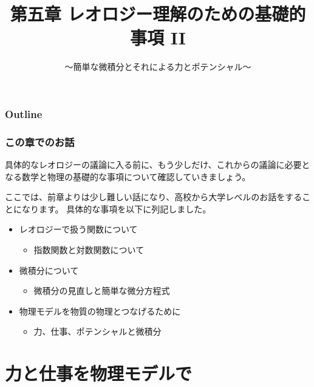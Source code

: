 \documentclass[unicode,12pt,aspectratio=169]{beamer}
\title{第五章 レオロジー理解のための基礎的事項 II}
\subtitle{～簡単な微積分とそれによる力とポテンシャル～}
\date{}
\begin{document}
\maketitle

\begin{frame}
\frametitle{Outline}
\tableofcontents
\end{frame}

\begin{frame}
	\frametitle{この章でのお話}
	具体的なレオロジーの議論に入る前に、もう少しだけ、これからの議論に必要となる数学と物理の基礎的な事項について確認していきましょう。
	
	ここでは、前章よりは少し難しい話になり、高校から大学レベルのお話をすることになります。
	具体的な事項を以下に列記しました。
	\begin{itemize}
		\item レオロジーで扱う関数について
		\begin{itemize}
			\item 指数関数と対数関数について
		\end{itemize} 
		\item 微積分について
		\begin{itemize}
			\item 微積分の見直しと簡単な微分方程式
		\end{itemize} 
		\item 物理モデルを物質の物理とつなげるために
		\begin{itemize}
			\item 力、仕事、ポテンシャルと微積分
		\end{itemize} 
	\end{itemize}
\end{frame}


\section{力と仕事を物理モデルで}
\end{document}
